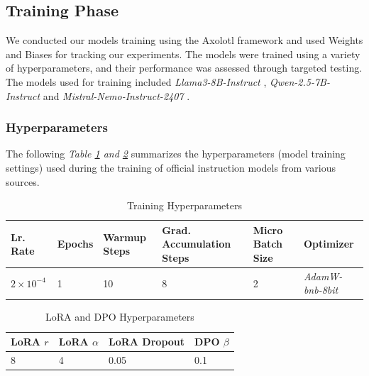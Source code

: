 \documentclass{article}
\begin{document}
\subsection{Training Phase}
We conducted our models training using the Axolotl \cite{lian2024axolotl} framework and used Weights and Biases \cite{wandb} for tracking our experiments. The models were trained using a variety of hyperparameters, and their performance was assessed through targeted testing. The models used for training included \textit{Llama3-8B-Instruct} \cite{grattafiori2024llama3herdmodels}, \textit{Qwen-2.5-7B-Instruct} \cite{bai2023qwentechnicalreport} and \textit{Mistral-Nemo-Instruct-2407} \cite{mistralnemo}.

\subsubsection{Hyperparameters}
\label{sec:hyperparameter_ref}
The following \textit{Table \ref{tab:training_hyperparameters} and \ref{tab:lora_dpo_hyperparameters}} summarizes the hyperparameters (model training settings) used during the training of official instruction models from various sources.

\begin{table}[h]
  \centering
  \begin{tabular}{p{1.5cm} p{1cm} p{2.3cm} p{4cm} p{2.5cm} p{2.7cm}}
    \toprule
     \textbf{Lr. Rate} & \textbf{Epochs} & \textbf{Warmup Steps} & \textbf{Grad. Accumulation Steps} & \textbf{Micro Batch Size} & \textbf{Optimizer} \\
    \midrule
     $2 \times 10^{-4}$ & 1 & 10 & 8 & 2 & \textit{AdamW-bnb-8bit} \\
    \bottomrule
  \end{tabular}
  \vspace{0.3cm}
  \caption{Training Hyperparameters}
  \label{tab:training_hyperparameters}
\end{table}

\vspace{0.5cm}

\begin{table}[h]
  \centering
  \begin{tabular}{p{2cm} p{2cm} p{2.5cm} p{2cm}}
    \toprule
     \textbf{LoRA $r$} & \textbf{LoRA $\alpha$} & \textbf{LoRA Dropout} & \textbf{DPO $\beta$} \\
    \midrule
     8 & 4 & 0.05 & 0.1 \\
    \bottomrule
  \end{tabular}
  \vspace{0.3cm}
  \caption{LoRA and DPO Hyperparameters}
  \label{tab:lora_dpo_hyperparameters}
\end{table}
\end{document}

